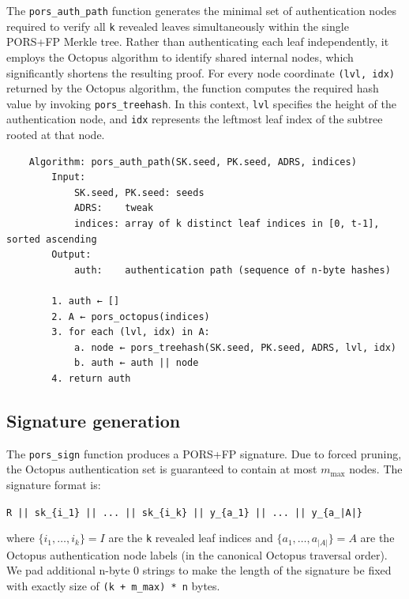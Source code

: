 The \texttt{pors\_auth\_path} function generates the minimal set of authentication nodes required to verify all \texttt{k} revealed leaves simultaneously within the single PORS+FP Merkle tree. 
Rather than authenticating each leaf independently, it employs the Octopus algorithm to identify shared internal nodes, which significantly shortens the resulting proof. 
For every node coordinate \texttt{(lvl, idx)} returned by the Octopus algorithm, the function computes the required hash value by invoking \texttt{pors\_treehash}. 
In this context, \texttt{lvl} specifies the height of the authentication node, and \texttt{idx} represents the leftmost leaf index of the subtree rooted at that node.
\begin{verbatim}
    Algorithm: pors_auth_path(SK.seed, PK.seed, ADRS, indices)
        Input:
            SK.seed, PK.seed: seeds
            ADRS:    tweak
            indices: array of k distinct leaf indices in [0, t-1], sorted ascending
        Output:
            auth:    authentication path (sequence of n-byte hashes)

        1. auth ← []
        2. A ← pors_octopus(indices)
        3. for each (lvl, idx) in A:  
            a. node ← pors_treehash(SK.seed, PK.seed, ADRS, lvl, idx)
            b. auth ← auth || node
        4. return auth
\end{verbatim}

\subsection{Signature generation}
The \texttt{pors\_sign} function produces a PORS+FP signature. Due to forced pruning, the Octopus authentication set is guaranteed to contain at most $m_{\max}$ nodes. The signature format is:
\begin{center}
    \texttt{R || sk\_\{i\_1\} || ... || sk\_\{i\_k\} || y\_\{a\_1\} || ... || y\_\{a\_{|A|}\}}
\end{center}
where $\{i_1,\dots,i_k\} = I$ are the \texttt{k} revealed leaf indices and $\{a_1,\dots,a_{|A|}\} = A$ are the Octopus authentication node labels (in the canonical Octopus traversal order).
We pad additional n-byte 0 strings to make the length of the signature be fixed with exactly size of \texttt{(k + m\_max) * n} bytes.

